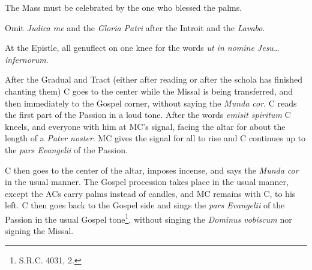 {	\rubric The Mass must be celebrated by the one who blessed the palms.

	\rubric Omit \textit{Judica me} and the \textit{Gloria Patri} after the
	Introit and the \textit{Lavabo}.

	\rubric At the Epistle, all genuflect on one knee for the words \textit{ut
	in nomine Jesu\dots infernorum}.

	\rubric After the Gradual and Tract (either after reading or after the
	schola has finished chanting them) C goes to the center while the Missal is
	being transferred, and then immediately to the Gospel corner, without
	saying the \textit{Munda cor}. C reads the first part of the Passion in a
	loud tone. After the words \textit{emisit spiritum} C kneels, and everyone
	with him at MC's signal, facing the altar for about the length of a
	\textit{Pater noster}. MC gives the signal for all to rise and C continues
	up to the \textit{pars Evangelii} of the Passion. 

    \rubric C then goes to the center of the altar, imposes incense, and says
    the \textit{Munda cor} in the usual manner. The Gospel procession takes
    place in the usual manner, except the ACs carry palms instead of candles,
    and MC remains with C, to his left. C then goes back to the Gospel side and
    sings the \textit{pars Evangelii} of the Passion in the usual Gospel
    tone\footnote{S.R.C. 4031, 2.}, without singing the \textit{Dominus
    vobiscum} nor signing the Missal.

	}
